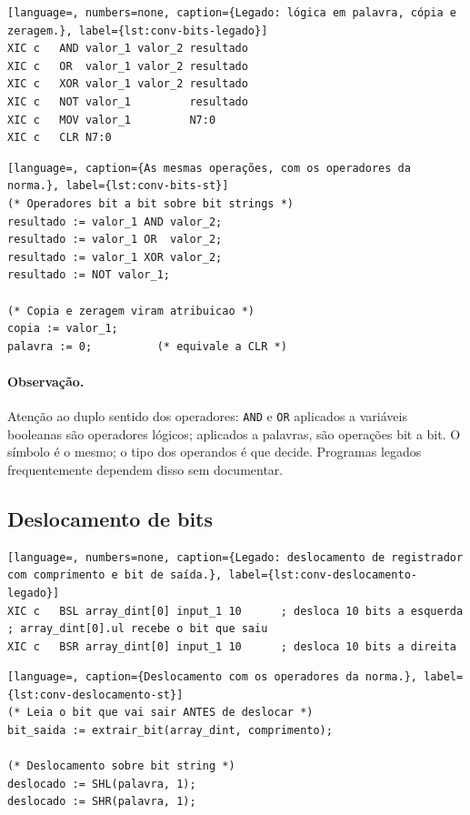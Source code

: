 \begin{lstlisting}[language=, numbers=none, caption={Legado: lógica em palavra, cópia e zeragem.}, label={lst:conv-bits-legado}]
XIC c   AND valor_1 valor_2 resultado
XIC c   OR  valor_1 valor_2 resultado
XIC c   XOR valor_1 valor_2 resultado
XIC c   NOT valor_1         resultado
XIC c   MOV valor_1         N7:0
XIC c   CLR N7:0
\end{lstlisting}

\begin{lstlisting}[language=, caption={As mesmas operações, com os operadores da norma.}, label={lst:conv-bits-st}]
(* Operadores bit a bit sobre bit strings *)
resultado := valor_1 AND valor_2;
resultado := valor_1 OR  valor_2;
resultado := valor_1 XOR valor_2;
resultado := NOT valor_1;

(* Copia e zeragem viram atribuicao *)
copia := valor_1;
palavra := 0;          (* equivale a CLR *)
\end{lstlisting}

\paragraph{Observação.} Atenção ao duplo sentido dos operadores: \texttt{AND} e \texttt{OR} aplicados a
variáveis booleanas são operadores lógicos; aplicados a palavras, são operações bit a bit. O símbolo é
o mesmo; o tipo dos operandos é que decide. Programas legados frequentemente dependem disso sem
documentar.

\subsection{Deslocamento de bits}

\begin{lstlisting}[language=, numbers=none, caption={Legado: deslocamento de registrador com comprimento e bit de saída.}, label={lst:conv-deslocamento-legado}]
XIC c   BSL array_dint[0] input_1 10      ; desloca 10 bits a esquerda
; array_dint[0].ul recebe o bit que saiu
XIC c   BSR array_dint[0] input_1 10      ; desloca 10 bits a direita
\end{lstlisting}

\begin{lstlisting}[language=, caption={Deslocamento com os operadores da norma.}, label={lst:conv-deslocamento-st}]
(* Leia o bit que vai sair ANTES de deslocar *)
bit_saida := extrair_bit(array_dint, comprimento);

(* Deslocamento sobre bit string *)
deslocado := SHL(palavra, 1);
deslocado := SHR(palavra, 1);
\end{lstlisting}

